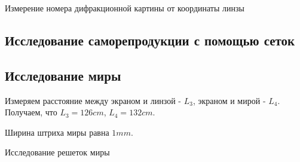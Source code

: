 \documentclass[15pt,a5paper,reqno]{article}
\begin{document}
\begin{table}[h!]
	\centering
	
	\caption{Измерение номера дифракционной картины от координаты линзы}
	\label{nu1}
\end{table}

\subsection{Исследование саморепродукции с помощью сеток}

\subsection{Исследование миры}

Измеряем расстояние между экраном и линзой - $L_3$, экраном и мирой - $L_4$.
Получаем, что $L_3 = 126 cm$, $L_4 = 132 cm$.

Ширина штриха миры равна $1 mm$.


\begin{table}[h!]
	\centering
	
	\caption{Исследование решеток миры}
	\label{nu1}
\end{table}
\end{document}
